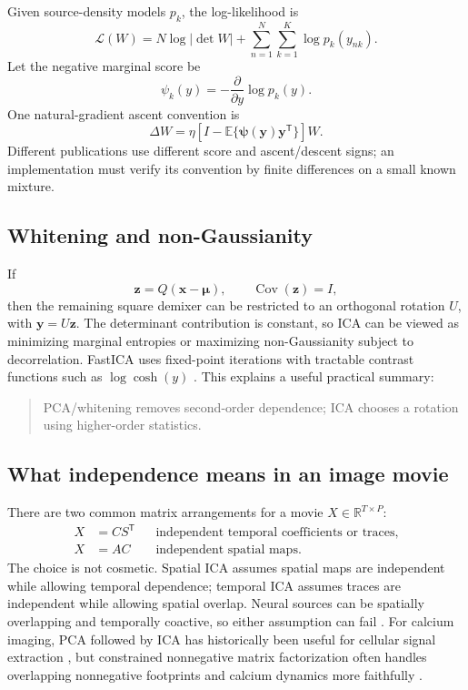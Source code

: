 \documentclass[11pt]{article}
\newcommand{\E}{\mathbb{E}}
\newcommand{\Cov}{\operatorname{Cov}}
\newcommand{\R}{\mathbb{R}}
\newcommand{\trans}{\mathsf T}
\begin{document}
Given source-density models $p_k$, the log-likelihood is
\begin{equation}
\mathcal L(W)
=
N\log|\det W|
+
\sum_{n=1}^{N}\sum_{k=1}^{K}
\log p_k(y_{nk}).
\label{eq:ica-likelihood}
\end{equation}
Let the negative marginal score be
\begin{equation}
\psi_k(y)=-\frac{\partial}{\partial y}\log p_k(y).
\end{equation}
One natural-gradient ascent convention is
\begin{equation}
\Delta W
=
\eta
\left[
I-\E\{\bm\psi(\bm y)\bm y^{\trans}\}
\right]W.
\label{eq:natural-gradient}
\end{equation}
Different publications use different score and ascent/descent signs; an
implementation must verify its convention by finite differences on a small
known mixture.

\subsection{Whitening and non-Gaussianity}

If
\begin{equation}
\bm z=Q(\bm x-\bm\mu),\qquad \Cov(\bm z)=I,
\end{equation}
then the remaining square demixer can be restricted to an orthogonal rotation
$U$, with $\bm y=U\bm z$. The determinant contribution is constant, so ICA can
be viewed as minimizing marginal entropies or maximizing non-Gaussianity subject
to decorrelation. FastICA uses fixed-point iterations with tractable contrast
functions such as $\log\cosh(y)$ \cite{hyvarinen1999fastica}. This explains a
useful practical summary:
\begin{quote}
PCA/whitening removes second-order dependence; ICA chooses a rotation using
higher-order statistics.
\end{quote}

\subsection{What independence means in an image movie}

There are two common matrix arrangements for a movie
$X\in\R^{T\times P}$:
\begin{align}
X&=CS^{\trans}
&&\text{independent temporal coefficients or traces},\\
X&=AC
&&\text{independent spatial maps}.
\end{align}
The choice is not cosmetic. Spatial ICA assumes spatial maps are independent
while allowing temporal dependence; temporal ICA assumes traces are independent
while allowing spatial overlap. Neural sources can be spatially overlapping and
temporally coactive, so either assumption can fail
\cite{calhoun2001spatialtemporal}. For calcium imaging, PCA followed by ICA has
historically been useful for cellular signal extraction
\cite{mukamel2009calcium}, but constrained nonnegative matrix factorization
often handles overlapping nonnegative footprints and calcium dynamics more
faithfully \cite{pnevmatikakis2016cnmf}.
\end{document}
